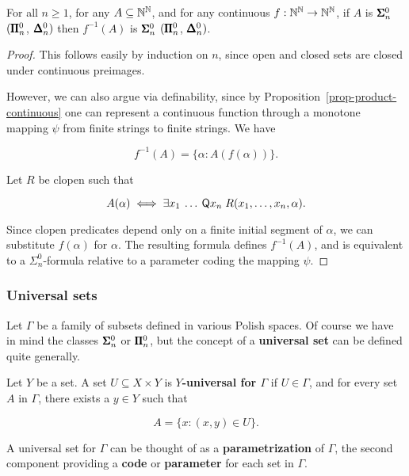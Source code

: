 \begin{proposition}\label{prop-borel_closure-preimages}For all $n \geq 1$, for any $A \subseteq \mathbb{N}^{\mathbb{N}}$, and for any continuous $f: \mathbb{N}^{\mathbb{N}} \to \mathbb{N}^{\mathbb{N}}$, if $A$ is $\pmb{\Sigma}^0_n$ $(\pmb{\Pi}^0_n$, $\pmb{\Delta}^0_n)$ then $f^{ -1}(A)$ is $\pmb{\Sigma}^0_n$ $(\pmb{\Pi}^0_n$, $\pmb{\Delta}^0_n)$.

\end{proposition}\begin{proof}This follows easily by induction on $n$, since open and closed sets are closed under continuous preimages.

However, we can also argue via definability, since by Proposition~\ref{prop-product-continuous} one can represent a continuous function through a monotone mapping $\psi$ from finite strings to finite strings.  We have

\begin{equation}
f^{-1}(A) = \{ \alpha \colon A(f(\alpha)) \}.
\end{equation}

Let $R$ be clopen such that

\begin{equation}
A(\alpha) \iff \exists x_1 \: \dots \: \mathsf{Q} x_n \; R(x_1, \dots, x_n, \alpha).
\end{equation}

Since clopen predicates depend only on a finite initial segment of $\alpha$, we can substitute $f(\alpha)$ for $\alpha$. The resulting formula defines $f^{ -1}(A)$, and is equivalent to a $\Sigma^0_n$-formula relative to a parameter coding the mapping $\psi$.

\end{proof}\subsubsection{Universal sets}

Let $\Gamma$ be a family of subsets defined in various Polish spaces. Of course we have in mind the classes $\pmb{\Sigma}^0_n$ or $\pmb{\Pi}^0_n$, but the concept of a \textbf{universal set} can be defined quite generally.

\begin{definition}\label{def-universal}Let $Y$ be a set. A set $U \subseteq X \times Y$ is \textbf{$Y$-universal for $\Gamma$} if $U \in \Gamma$, and for every set $A$ in $\Gamma$, there exists a $y \in Y$ such that

\begin{equation}
A = \{ x \colon (x,y) \in U \}.
\end{equation}

\end{definition}A universal set for $\Gamma$ can be thought of as a \textbf{parametrization} of $\Gamma$, the second component providing a \textbf{code} or \textbf{parameter} for each set in $\Gamma$.


